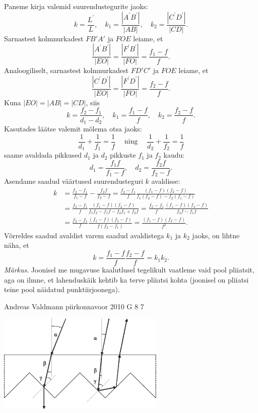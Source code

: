 \documentclass[11pt]{article}
\begin{document}
{{Paneme kirja valemid suurendustegurite jaoks:
\[
k=\frac{L^{\prime}}{L}, \quad k_{1}=\frac{|A^{\prime}B^{\prime}|}{|AB|}, \quad k_{2}=\frac{|C^{\prime}D^{\prime}|}{|CD|}.
\]
Sarnastest kolmnurkadest $FB'A'$ ja $FOE$ leiame, et
\[
\frac{|A^{\prime}B^{\prime}|}{|EO|}=\frac{|F^{\prime}B^{\prime}|}{|FO|}=\frac{f_{1}-f}{f}.
\]
Analoogiliselt, sarnastest kolmnurkadest $FD'C'$ ja $FOE$ leiame, et
\[
\frac{|C^{\prime}D^{\prime}|}{|EO|}=\frac{|F^{\prime}D^{\prime}|}{|FO|}=\frac{f_{2}-f}{f}.
\]
Kuna $|EO| = |AB| = |CD|$, siis
\[
k=\frac{f_{2}-f_{1}}{d_{1}-d_{2}}, \quad k_{1}=\frac{f_{1}-f}{f}, \quad k_{2}=\frac{f_{2}-f}{f}.
\]
Kasutades läätse valemit mõlema otsa jaoks:
\[
\frac{1}{d_{1}}+\frac{1}{f_{1}}=\frac{1}{f} \quad \operatorname{ning} \quad \frac{1}{d_{2}}+\frac{1}{f_{2}}=\frac{1}{f}
\]
saame avaldada pikkused $d_1$ ja $d_2$ pikkuste $f_1$ ja $f_2$ kaudu:
\[
d_{1}=\frac{f_{1} f}{f_{1}-f}, \quad d_{2}=\frac{f_{2} f}{f_{2}-f}.
\]
Asendame saadud väärtused suurendusteguri $k$ avaldisse:
\[
\begin{aligned}
	k&=\frac{f_{2}-f_{1}}{f_{1}-f}-\frac{f_{2} f}{f_{2}-f}=\frac{f_{2}-f_{1}}{f} \frac{\left(f_{1}-f\right)\left(f_{2}-f\right)}{f_{1}\left(f_{2}-f\right)-f_{2}\left(f_{1}-f\right)} \\ 
	&=\frac{f_{2}-f_{1}}{f} \frac{\left(f_{1}-f\right)\left(f_{2}-f\right)}{f_{1} f_{2}-f_{1} f-f_{2} f_{1}+f_{2} f}=\frac{f_{2}-f_{1}}{f} \frac{\left(f_{1}-f\right)\left(f_{2}-f\right)}{f_{2} f-f_{1} f} \\ &=\frac{f_{2}-f_{1}}{f} \frac{\left(f_{1}-f\right)\left(f_{2}-f\right)}{f\left(f_{2}-f_{1}\right)}=\frac{\left(f_{1}-f\right)\left(f_{2}-f\right)}{f^{2}}.
\end{aligned}
\]
Võrreldes saadud avaldist varem saadud avaldistega $k_1$ ja $k_2$ jaoks, on lihtne näha, et
\[
k=\frac{f_{1}-f}{f} \frac{f_{2}-f}{f}=k_{1} k_{2}.
\]
\emph{Märkus}. Joonisel me mugavuse kaalutlusel tegelikult vaatleme vaid pool pliiatsit, aga on ilmne, et lahenduskäik kehtib ka terve pliiatsi kohta (joonisel on pliiatsi teine pool näidatud punktiirjoonega).
\fi
}

{Andreas Valdmann} %
{piirkonnavoor} %
{2010} %
{G 8} %
{7} %
{

\ifSolution
\begin{center}
	\includegraphics[width=0.6\textwidth]{2010-v2g-08-hajuti_lah.eps}
\end{center}

}}
\end{document}
